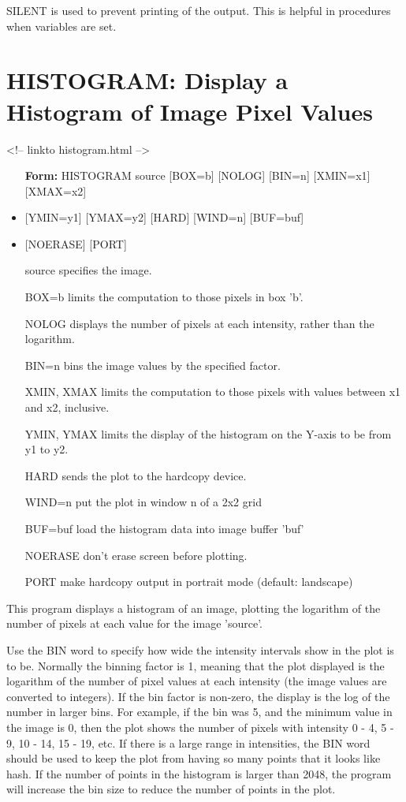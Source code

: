 SILENT is used to prevent printing of the output.  This is helpful in
procedures when variables are set.

\section{HISTOGRAM: Display a Histogram of Image Pixel Values}
\begin{rawhtml}
<!-- linkto histogram.html -->
\end{rawhtml}
\begin{itemize}
  \item[\textbf{Form:}   HISTOGRAM source {[BOX=b]} {[NOLOG]} {[BIN=n]} {[XMIN=x1]} {[XMAX=x2]}\hfill]{}
  \item{{[YMIN=y1]} {[YMAX=y2]} {[HARD]} {[WIND=n]} {[BUF=buf]}}
  \item{{[NOERASE]} {[PORT]}}
  \item[source\hfill]{   specifies the image.}
  \item[BOX=b\hfill]{limits the computation to those pixels in box 'b'.}
  \item[NOLOG\hfill]{displays the number of pixels at each intensity,
rather than the logarithm.}
  \item[BIN=n\hfill]{   bins the image values by the specified factor.}
  \item[XMIN, XMAX\hfill]{  limits the computation to those pixels with values
between x1 and x2, inclusive.}
  \item[YMIN, YMAX   \hfill]{   limits the display of the histogram on the Y-axis
to be from y1 to y2.}
  \item[HARD\hfill]{sends the plot to the hardcopy device.}
  \item[WIND=n\hfill]{put the plot in window n of a 2x2 grid}
  \item[BUF=buf\hfill]{  load the histogram data into image buffer 'buf'}
  \item[   NOERASE   \hfill]{don't erase screen before plotting.}
  \item[PORT\hfill]{make hardcopy output in portrait mode (default: landscape)}
\end{itemize}

This program displays a histogram of an image, plotting the logarithm of
the number of pixels at each value for the image 'source'.

Use the BIN word to specify how wide the intensity intervals show in the
plot is to be.  Normally the binning factor is 1, meaning that the plot
displayed is the logarithm of the number of pixel values at each intensity
(the image values are converted to integers).  If the bin factor is
non-zero, the display is the log of the number in larger bins.  For
example, if the bin was 5, and the minimum value in the image is 0, then
the plot shows the number of pixels with intensity 0 - 4, 5 - 9, 10 - 14,
15 - 19, etc. If there is a large range in intensities, the BIN word should
be used to keep the plot from having so many points that it looks like
hash. If the number of points in the histogram is larger than 2048, the
program will increase the bin size to reduce the number of points in the
plot.

